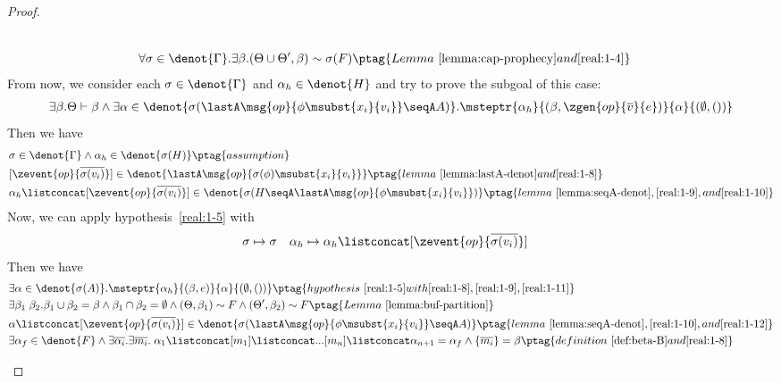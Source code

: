 \begin{proof}
\begin{enumerate}[label=Case]
{\begin{alignat}{2}
\\&\forall \sigma \in\denot{\Gamma}. \exists \beta. (\Theta \cup \Theta', \beta) \sim \sigma(F) \ptag{Lemma~\ref{lemma:cap-prophecy} and \ref{real:1-4}} \label{real:1-8}
\end{alignat}}\noindent
From now, we consider each $\sigma \in \denot{\Gamma}$ and $\alpha_h \in \denot{H}$ and try to prove the subgoal of this case: 
{\footnotesize\begin{align*}
    \exists \beta. \Theta \vdash \beta \land \exists \alpha \in\denot{\sigma(\lastA\msg{op}{\phi\msubst{x_i}{v_i}} \seqA A)}. \msteptr{\alpha_h}{(\beta, \zgen{op}{\overline{v}}{e})}{\alpha}{(\emptyset, ())}
\end{align*}}\noindent
Then we have
{\footnotesize\begin{alignat}{2}
&\sigma \in \denot{\Gamma} \land \alpha_h \in \denot{\sigma(H)} \ptag{assumption} \label{real:1-9}
\\& [\zevent{op}{\overline{\sigma(v_i)}}] \in \denot{\lastA\msg{op}{\sigma(\phi)\msubst{x_i}{v_i}}} \ptag{lemma~\ref{lemma:lastA-denot} and \ref{real:1-8}} \label{real:1-10}
\\& \alpha_h \listconcat [\zevent{op}{\overline{\sigma(v_i)}}] \in \denot{\sigma(H \seqA \lastA\msg{op}{\phi\msubst{x_i}{v_i}})} \ptag{lemma~\ref{lemma:seqA-denot}, \ref{real:1-9}, and \ref{real:1-10}} \label{real:1-11}
\end{alignat}}\noindent
Now, we can apply hypothesis~\ref{real:1-5} with 
{\footnotesize\begin{align*}
    &\sigma \mapsto \sigma \quad \alpha_h \mapsto \alpha_h \listconcat [\zevent{op}{\overline{\sigma(v_i)}}]
\end{align*}}\noindent
Then we have
{\footnotesize\begin{alignat}{2}
&\exists \alpha \in\denot{\sigma(A)}. \msteptr{\alpha_h}{(\beta, e)}{\alpha}{(\emptyset, ())} \ptag{hypothesis~\ref{real:1-5} with \ref{real:1-8}, \ref{real:1-9}, \ref{real:1-11}} \label{real:1-12}
\\& \exists \beta_1\;\beta_2. \beta_1 \cup \beta_2 = \beta \land \beta_1 \cap \beta_2 = \emptyset \land (\Theta, \beta_1) \sim F \land (\Theta', \beta_2) \sim F \ptag{Lemma~\ref{lemma:buf-partition}} \label{real:1-13}
\\& \alpha \listconcat [\zevent{op}{\overline{\sigma(v_i)}}] \in \denot{\sigma(\lastA\msg{op}{\phi\msubst{x_i}{v_i}} \seqA A)} \ptag{lemma~\ref{lemma:seqA-denot}, \ref{real:1-10}, and \ref{real:1-12}} \label{real:1-14}
\\&\exists \alpha_f \in \denot{F} \land \exists \overline{\alpha_i}. \exists \overline{m_i}.\; \alpha_1 \listconcat [m_1] \listconcat ... [m_{n}] \listconcat \alpha_{n+1} = \alpha_f \land \{\overline{m_i}\} = \beta \ptag{definition~\ref{def:beta-B} and \ref{real:1-8}} \label{real:1-15}

\end{alignat}}
\end{enumerate}
\end{proof}

